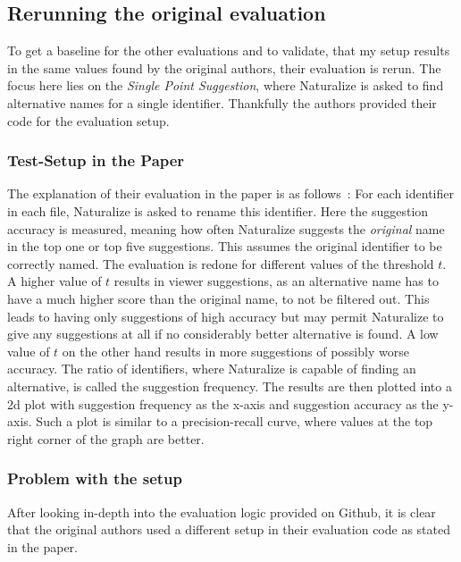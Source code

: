 \subsection{Rerunning the original evaluation}
To get a baseline for the other evaluations and to validate, that my setup results in the same values found
by the original authors, their evaluation is rerun. The focus here lies on the \emph{Single Point Suggestion},
where Naturalize is asked to find alternative names for a single identifier. Thankfully the authors provided
their code for the evaluation setup.

\subsubsection{Test-Setup in the Paper}
The explanation of their evaluation in the paper is as follows~\cite{naturalize}:
For each identifier in each file, Naturalize is asked to rename this identifier.
Here the suggestion accuracy is measured, meaning how often Naturalize suggests the \emph{original} name in the top one
or top five suggestions. This assumes the original identifier to be correctly named.
The evaluation is redone for different values of the threshold $t$. A higher value of $t$ results in viewer
suggestions, as an alternative name has to have a much higher score than the original name, to not be
filtered out. This leads to having only suggestions of high accuracy but may permit Naturalize to give
any suggestions at all if no considerably better alternative is found. A low value of $t$ on the other hand results in
more suggestions of possibly worse accuracy.
The ratio of identifiers, where Naturalize is capable of finding an alternative, is called the suggestion frequency.
The results are then plotted into a 2d plot with suggestion frequency as the x-axis and suggestion accuracy as the y-axis. Such a plot is similar to a precision-recall curve, where values at the top right corner of the graph are better.

\subsubsection{Problem with the setup}
After looking in-depth into the evaluation logic provided on Github, it is clear that the original authors used a different setup in their evaluation code as stated in
the paper. 

